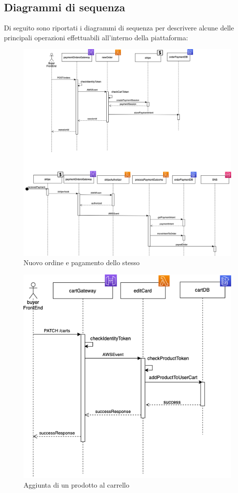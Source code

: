 \subsection{Diagrammi di sequenza}\label{Diagrammiseq}
Di seguito sono riportati i diagrammi di sequenza per descrivere alcune delle principali operazioni effettuabili all'interno della piattaforma:
\begin{figure}[H]
	\centering
	\includegraphics[scale=0.5]{Immagini/Backend/Diagrammiseq.png}
	\caption{Nuovo ordine e pagamento dello stesso}
	\label{fig:Diagrammiseq}
\end{figure}
\begin{figure}[H]
	\centering
	\includegraphics[scale=0.5]{Immagini/Backend/AggiuntaProdottoAlCarrello.png}
	\caption{Aggiunta di un prodotto al carrello}
	\label{fig:DiagrammaCarrello}
\end{figure}
